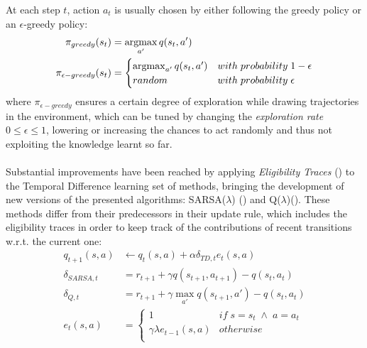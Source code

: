                 At each step $t$, action $a_t$ is usually chosen by either following the greedy policy or an $\epsilon$-greedy policy:
                \begin{align*}
                    \pi_{greedy}(s_t) &= \operatorname*{argmax}_{a'}q(s_t, a')\\
                    \pi_{\epsilon -greedy}(s_t) &= 
                                    \begin{cases} 
                                        \operatorname*{argmax}_{a'}q(s_t, a') & with \; probability \; 1 - \epsilon \\
                                        random & with \; probability \; \epsilon \\ 
                                    \end{cases}
                \end{align*}
                where $\pi_{\epsilon -greedy}$ ensures a certain degree of exploration while drawing trajectories in the environment, which can be tuned by changing the \textit{exploration rate} $0 \leq \epsilon \leq 1$, lowering or increasing the chances to act randomly and thus not exploiting the knowledge learnt so far.
                \\\\
                Substantial improvements have been reached by applying \textit{Eligibility Traces} () to the Temporal Difference learning set of methods, bringing the development of new versions of the presented algorithms: SARSA($\lambda$) () and Q($\lambda$)(). These methods differ from their predecessors in their update rule, which includes the eligibility traces in order to keep track of the contributions of recent transitions w.r.t. the current one:
                \begin{align*}
                    q_{t+1}(s, a) &\leftarrow q_{t}(s, a) + \alpha \delta_{TD, t} e_t(s, a)\\
                    \delta_{SARSA, t}    &= r_{t+1} + \gamma q(s_{t+1}, a_{t+1}) - q(s_t, a_t)\\
                    \delta_{Q, t}        &= r_{t+1} + \gamma \max_{a'} q(s_{t+1}, a') - q(s_t, a_t)\\
                    e_{t}(s,a) &= 
                            \begin{cases} 
                                1 & if \; s = s_t \; \wedge \; a = a_t \\
                                \gamma \lambda e_{t-1}(s, a) & otherwise \\ 
                            \end{cases}
                \end{align*}
